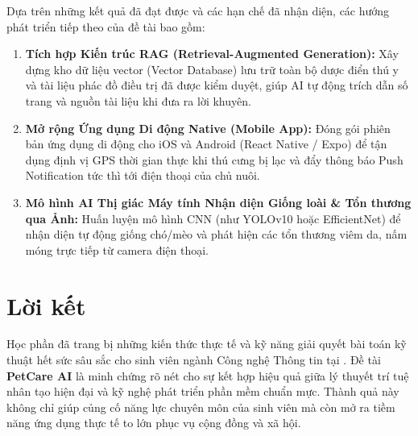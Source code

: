 Dựa trên những kết quả đã đạt được và các hạn chế đã nhận diện, các hướng phát triển tiếp theo của đề tài bao gồm:
\begin{enumerate}[label=\alph*)]
    \item \textbf{Tích hợp Kiến trúc RAG (Retrieval-Augmented Generation):} Xây dựng kho dữ liệu vector (Vector Database) lưu trữ toàn bộ dược điển thú y và tài liệu phác đồ điều trị đã được kiểm duyệt, giúp AI tự động trích dẫn số trang và nguồn tài liệu khi đưa ra lời khuyên.
    \item \textbf{Mở rộng Ứng dụng Di động Native (Mobile App):} Đóng gói phiên bản ứng dụng di động cho iOS và Android (React Native / Expo) để tận dụng định vị GPS thời gian thực khi thú cưng bị lạc và đẩy thông báo Push Notification tức thì tới điện thoại của chủ nuôi.
    \item \textbf{Mô hình AI Thị giác Máy tính Nhận diện Giống loài \& Tổn thương qua Ảnh:} Huấn luyện mô hình CNN (như YOLOv10 hoặc EfficientNet) để nhận diện tự động giống chó/mèo và phát hiện các tổn thương viêm da, nấm móng trực tiếp từ camera điện thoại.
\end{enumerate}

\section{Lời kết}
\label{sec:loiket}

Học phần \textbf{\course} đã trang bị những kiến thức thực tế và kỹ năng giải quyết bài toán kỹ thuật hết sức sâu sắc cho sinh viên ngành Công nghệ Thông tin tại \university. Đề tài \textbf{PetCare AI} là minh chứng rõ nét cho sự kết hợp hiệu quả giữa lý thuyết trí tuệ nhân tạo hiện đại và kỹ nghệ phát triển phần mềm chuẩn mực. Thành quả này không chỉ giúp củng cố năng lực chuyên môn của sinh viên mà còn mở ra tiềm năng ứng dụng thực tế to lớn phục vụ cộng đồng và xã hội.
